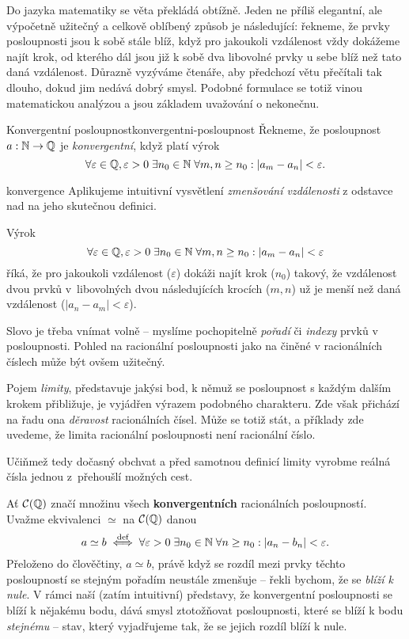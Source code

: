 Do jazyka matematiky se věta  překládá
obtížně. Jeden ne příliš elegantní, ale výpočetně užitečný a celkově oblíbený
způsob je následující: řekneme, že prvky posloupnosti jsou k sobě stále blíž,
když pro jakoukoli vzdálenost vždy dokážeme najít krok, od kterého dál jsou již
k sobě dva libovolné prvky u sebe blíž než tato daná vzdálenost. Důrazně
vyzýváme čtenáře, aby předchozí větu přečítali tak dlouho, dokud jim nedává
dobrý smysl. Podobné formulace se totiž vinou matematickou analýzou a jsou
základem uvažování o nekonečnu.

\begin{definition}{Konvergentní posloupnost}{konvergentni-posloupnost}
 Řekneme, že posloupnost $a:\mathbb{N} \to \mathbb{Q}$ je \emph{konvergentní}, když platí výrok
 \[
  \forall \varepsilon \in \mathbb{Q}, \varepsilon>0 \; \exists n_0 \in \mathbb{N} \; \forall m,n
  \geq n_0: |a_m - a_n| < \varepsilon.
 \]
\end{definition}

\begin{remark}{}{konvergence}
 Aplikujeme intuitivní vysvětlení \emph{zmenšování vzdálenosti} z odstavce nad
  na jeho skutečnou definici.

 Výrok
 \[
  \forall \varepsilon \in \mathbb{Q}, \varepsilon>0 \; \exists n_0 \in \mathbb{N} \; \forall m,n
  \geq n_0: |a_m - a_n| < \varepsilon
 \]
 říká, že pro jakoukoli vzdálenost ($\varepsilon$) dokáži najít krok ($n_0$)
 takový, že vzdálenost dvou prvků v~libovolných dvou následujících krocích
 ($m,n$) už je menší než daná vzdálenost ($|a_n -a_m|<\varepsilon$).

 Slovo  je třeba vnímat volně -- myslíme pochopitelně \emph{pořadí} či
 \emph{indexy} prvků v posloupnosti. Pohled na racionální posloupnosti jako na
  činěné v racionálních číslech může být ovšem užitečný.
\end{remark}

Pojem \emph{limity}, představuje jakýsi bod, k němuž se posloupnost s každým
dalším krokem přibližuje, je vyjádřen výrazem podobného charakteru. Zde však
přichází na řadu ona \emph{děravost} racionálních čísel. Může se totiž stát, a
příklady zde uvedeme, že limita racionální posloupnosti není racionální číslo.

Učiňmež tedy dočasný obchvat a před samotnou definicí limity vyrobme reálná
čísla jednou z~přehoušlí možných cest. 

Ať $\mathcal{C}(\mathbb{Q})$ značí množinu všech \textbf{konvergentních }racionálních
posloupností. Uvažme ekvivalenci $ \simeq $ na $\mathcal{C}(\mathbb{Q})$ danou
\[
 a \simeq b \overset{\text{def}}{\iff} \forall \varepsilon>0 \; \exists n_0 \in \mathbb{N}
 \; \forall n \geq n_0: |a_n - b_n| < \varepsilon.
\]
Přeloženo do člověčtiny, $a \simeq b$, právě když se rozdíl mezi prvky těchto
posloupností se stejným pořadím neustále zmenšuje -- řekli bychom, že se
\emph{blíží k nule}. V rámci naší (zatím intuitivní) představy, že konvergentní
posloupnosti se blíží k nějakému bodu, dává smysl ztotožňovat posloupnosti,
které se blíží k bodu \emph{stejnému} -- stav, který vyjadřujeme tak, že se
jejich rozdíl blíží k nule.

